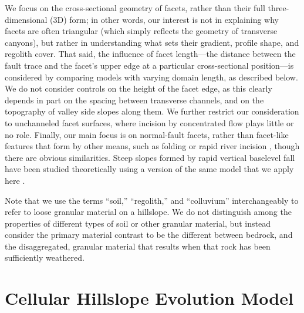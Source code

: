 We focus on the cross-sectional geometry of facets, rather than their full three-dimensional (3D) form; in other words, our interest is not in explaining why facets are often triangular (which simply reflects the geometry of transverse canyons), but rather in understanding what sets their gradient, profile shape, and regolith cover. That said, the influence of facet length---the distance between the fault trace and the facet's upper edge at a particular cross-sectional position---is considered by comparing models with varying domain length, as described below. We do not consider controls on the height of the facet edge, as this clearly depends in part on the spacing between transverse channels, and on the topography of valley side slopes along them. We further restrict our consideration to unchanneled facet surfaces, where incision by concentrated flow plays little or no role. Finally, our main focus is on normal-fault facets, rather than facet-like features that  form by other means, such as folding or rapid river incision \citep[e.g.,][]{cotton1950tectonic}, though there are obvious similarities. Steep slopes formed by rapid vertical baselevel fall have been studied theoretically using a version of the same model that we apply here \citet{tucker2018lattice}.

Note that we use the terms ``soil,'' ``regolith,'' and ``colluvium'' interchangeably to refer to loose granular material on a hillslope. We do not distinguish among the properties of different types of soil or other granular material, but instead consider the primary material contrast to be the different between bedrock, and the disaggregated, granular material that results when that rock has been sufficiently weathered.


\section{Cellular Hillslope Evolution Model}

